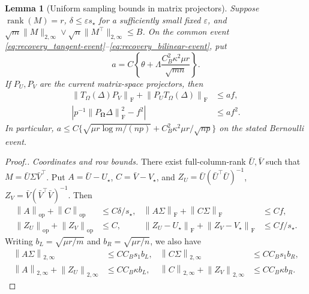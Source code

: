 \documentclass[numsec,webpdf,modern,large,namedate]{oup-authoring-template}
\theoremstyle{plain}
\newtheorem{slemma}{Lemma}%
\theoremstyle{remark}
\newcommand{\bOmega}{\bm{\Omega}}
\providecommand{\op}{\mathrm{op}}
\providecommand{\F}{\mathrm{F}}
\providecommand{\PP}{P_{\bOmega}}
\providecommand{\TT}{T_\Omega}
\providecommand{\norm}[1]{\left\|#1\right\|}
\DeclareMathOperator{\rank}{rank}
\newif\ifmarkchanges
\newenvironment{revision}{\begingroup\ifmarkchanges\color{red}\fi}{\endgroup}
\begin{document}
\begin{revision}
\begin{slemma}[Uniform sampling bounds in matrix projectors]
\label{lem:recovery_sampling}
Suppose $\rank(M)=r$, $\delta\le\varepsilon s_\star$ for a sufficiently
small fixed $\varepsilon$, and
$\sqrt m\|M\|_{2,\infty}\vee\sqrt n\|M^\top\|_{2,\infty}\le B$.
On the common event \eqref{eq:recovery_tangent-event}--\eqref{eq:recovery_bilinear-event}, put
\[
 a=C\left\{\theta+\Lambda\frac{C_B^2\kappa^2\mu r}{\sqrt{mn}}\right\}.
\]
If $P_U,P_V$ are the current matrix-space projectors, then
\begin{align}
 \norm{\TT(\Delta)P_V}_\F+\norm{P_U\TT(\Delta)}_\F&\le a f,
 \label{eq:recovery_projected-sampling}\\
 \left|p^{-1}\norm{\PP\Delta}_\F^2-f^2\right|&\le a f^2.
 \label{eq:recovery_energy}
\end{align}
In particular,
$a\le C\{\sqrt{\mu r\log m/(np)}+C_B^2\kappa^2\mu r/\sqrt{np}\}$
on the stated Bernoulli event.
\end{slemma}
\begin{proof}[Proof.]
\textit{Coordinates and row bounds.} There exist full-column-rank $\bar U,\bar V$ such that
$M=\bar U\Sigma\bar V^\top$.  Put
$A=\bar U-U_\star$, $C=\bar V-V_\star$, and
$Z_U=\bar U(\bar U^\top\bar U)^{-1}$,
$Z_V=\bar V(\bar V^\top\bar V)^{-1}$.
Then
\begin{align}
 \norm{A}_\op+\norm{C}_\op&\le C\delta/s_\star,
 &\norm{A\Sigma}_\F+\norm{C\Sigma}_\F&\le C f,\label{eq:recovery_canonical-main}\\
 \norm{Z_U}_\op+\norm{Z_V}_\op&\le C,
 &\norm{Z_U-U_\star}_\F+\norm{Z_V-V_\star}_\F&\le C f/s_\star.
 \label{eq:recovery_canonical-Z}
\end{align}
Writing $b_L=\sqrt{\mu r/m}$ and $b_R=\sqrt{\mu r/n}$, we also have
\begin{align}
 \norm{A\Sigma}_{2,\infty}&\le C C_B s_1 b_L,
 &\norm{C\Sigma}_{2,\infty}&\le C C_B s_1 b_R,\label{eq:recovery_weightedrows}\\
 \norm{A}_{2,\infty}+\norm{Z_U}_{2,\infty}&\le C C_B\kappa b_L,
 &\norm{C}_{2,\infty}+\norm{Z_V}_{2,\infty}&\le C C_B\kappa b_R.
 \label{eq:recovery_unweightedrows}
\end{align}


\end{proof}
\end{revision}
\end{document}
